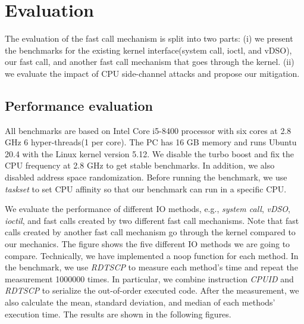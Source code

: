 \chapter{Evaluation}
\label{sec:evaluation}


The evaluation of the fast call mechanism is split into two parts: 
(i) we present the benchmarks for the existing kernel interface(system 
call, ioctl, and vDSO), our fast call, and another fast call mechanism that 
goes through the kernel.  (ii) we evaluate the impact of CPU side-channel attacks\cite{3,4} 
and propose our mitigation.

\section{Performance evaluation}

All benchmarks are based on  Intel Core i5-8400 processor 
with six cores at 2.8 GHz 6 hyper-threads(1 per core). 
The PC has 16 GB memory and runs Ubuntu 20.4 with the Linux 
kernel version 5.12. We disable the turbo boost and fix the 
CPU frequency at 2.8 GHz to get stable benchmarks. 
In addition, we also disabled address space randomization. 
Before running the benchmark, we use \emph{taskset} to set CPU 
affinity so that our benchmark can run in a specific CPU.  

We evaluate the performance of different IO methods, e.g., 
\emph{system call}, \emph{vDSO},  \emph{ioctil}, and fast calls created by two 
different fast call mechanisms. Note that fast calls created 
by another fast call mechanism go through the kernel compared 
to our mechanics.  The figure shows the five different IO 
methods we are going to compare. Technically, we have implemented a 
noop function for each method. In the benchmark, we use \emph{RDTSCP}\cite{14} to 
measure each method's time and repeat the measurement 1000000 times. 
In particular, we combine instruction \emph{CPUID} and \emph{RDTSCP} to serialize 
the out-of-order executed code.  After the measurement, we also 
calculate the mean, standard deviation, and median of each methods' 
execution time. The results are shown in the following figures.


